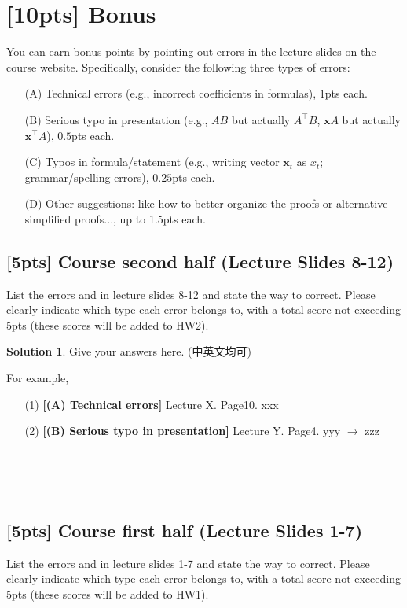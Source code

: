 \documentclass[a4paper]{article}
\numberwithin{equation}{section}
\theoremstyle{definition}
\newtheorem*{solution}{Solution}
\theoremstyle{definition}
\def \x {\textbf{x}}
\begin{document}
\section{[10pts] Bonus}
You can earn bonus points by pointing out errors in the lecture slides on the course website. Specifically, consider the following three types of errors:
\begin{tcolorbox}
    \begin{enumerate}
    \item[(A)] Technical errors (e.g., incorrect coefficients in formulas), $1$pts each.
    \item[(B)] Serious typo in presentation (e.g., $AB$ but actually $A^\top B$, $\x A$ but actually $\x^\top A$), $0.5$pts each.
    \item[(C)] Typos in formula/statement (e.g., writing vector $\x_t$ as $x_t$; grammar/spelling errors), $0.25$pts each.
    \item[(D)] Other suggestions: like how to better organize the proofs or alternative simplified proofs..., up to 1.5pts each.
    \end{enumerate}
\end{tcolorbox}
\subsection{[5pts] Course second half (Lecture Slides 8-12)}
\underline{List} the errors and in lecture slides 8-12 and \underline{state} the way to correct. Please clearly indicate which type each error belongs to, with a total score not exceeding 5pts (these scores will be added to HW2).
\begin{solution}
  Give your answers here. (中英文均可)

For example, 
\begin{enumerate}
    \item[(1)] \textbf{[(A) Technical errors]} Lecture X. Page10. xxx
    \item[(2)] \textbf{[(B) Serious typo in presentation]} Lecture Y. Page4. yyy $\rightarrow$ zzz
\end{enumerate}
~\\
  ~\\
  ~\\
\end{solution}

\subsection{[5pts] Course first half (Lecture Slides 1-7)}
\underline{List} the errors and in lecture slides 1-7 and \underline{state} the way to correct. Please clearly indicate which type each error belongs to, with a total score not exceeding 5pts (these scores will be added to HW1). 
\end{document}
